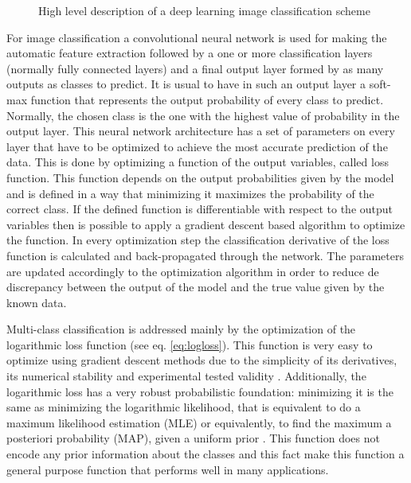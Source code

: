 \documentclass[times,twocolumn,final,authoryear]{elsarticle}
\begin{document}
\begin{figure}[!h]
	\label{fig:classification}
	\centering
	\caption{High level description of a deep learning image classification scheme}
\end{figure}

For image classification a convolutional neural network is used for making the automatic feature extraction followed by a one or more classification layers (normally fully connected layers) and a final output layer formed by as many outputs as classes to predict. It is usual to have in such an output layer a soft-max function that represents the output probability of every class to predict. Normally, the chosen class is the one with the highest value of probability in the output layer. This neural network architecture has a set of parameters on every layer that have to be optimized to achieve the most accurate prediction of the data. This is done by optimizing a function of the output variables, called loss function. This function depends on the output probabilities given by the model and is defined in a way that minimizing it maximizes the probability of the correct class. If the defined function is differentiable with respect to the output variables then is possible to apply a gradient descent based algorithm to optimize the function. In every optimization step the classification derivative of the loss function is calculated and back-propagated through the network. The parameters are updated accordingly to the optimization algorithm in order to reduce de discrepancy between the output of the model and the true value given by the known data.

Multi-class classification is addressed mainly by the optimization of the logarithmic loss function (see eq. \ref{eq:logloss}). This function is very easy to optimize using gradient descent methods due to the simplicity of its derivatives, its numerical stability and experimental tested validity \citep{Goodfellow-et-al-2016}. Additionally, the logarithmic loss has a very robust probabilistic foundation: minimizing it is the same as minimizing the logarithmic likelihood, that is equivalent to do a maximum likelihood estimation (MLE) or equivalently, to find the maximum a posteriori probability (MAP), given a uniform prior \citep{Murphy:2012:MLP:2380985}. This function does not encode any prior information about the classes and this fact make this function a general purpose function that performs well in many applications. 
\end{document}

